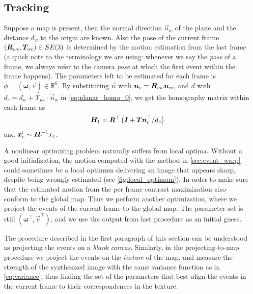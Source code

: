 \subsection{Tracking}
\label{sec:tracking}
Suppose a map is present, then the normal direction $\vec{n}_w$ of the
plane and the distance $d_w$ to the origin are known. Also the pose of
the current frame $(\mat{R}_{wc}, \vec{T}_{wc})\in SE(3)$ is
determined by the motion estimation from the last frame (a quick note
to the terminology we are using: whenever we say the \textit{pose} of
a frame, we always refer to the camera \textit{pose} at which the
first event within the frame happens). The parameters left to be
estimated for each frame is
$\phi=\left(\bm{\omega},\vec{v}\right)\in\mathbb{R}^6$. By
substituting $\vec{n}$ with $\vec{n}_c = \mat{R}_{cw}\vec{n}_w$, and
$d$ with $d_c = d_w+\vec{T}_{wc}\cdot\vec{n}_w$ in
\cref{eq:planar_homo_0}, we get the homography matrix within each
frame as
\begin{equation}
  \label{eq:planar_homo_1}
  \mat{H}_1=\mat{R}^\top\left(\mat{I}+\vec{T}\vec{n}_c^\top/d_c\right)
\end{equation}
and $\vec{x}'_c\sim\mat{H}_1^{-1}x_c$.

A nonlinear optimizing problem naturally suffers from local
optima. Without a good initialization, the motion computed with the
method in \cref{sec:event_warp} could sometimes be a local optimum
delivering an image that appears sharp, despite being wrongly
estimated (see \cref{fig:local_optimum}). In order to make sure that
the estimated motion from the per frame contrast maximization also
conform to the global map. Thus we perform another optimization, where
we project the events of the current frame to the global map. The
parameter set is still $\left(\bm{\omega}^\top,\vec{v}^\top\right)$,
and we use the output from last procedure as an initial guess.

The procedure described in the first paragraph of this section can be
understood as projecting the events on a \textit{blank
  canvas}. Similarly, in the projecting-to-map procedure we project
the events on the \textit{texture} of the map, and measure the
strength of the synthesized image with the same variance function as
in \cref{eq:variance}, thus finding the set of the parameters that
best align the events in the current frame to their correspondences in
the texture.

